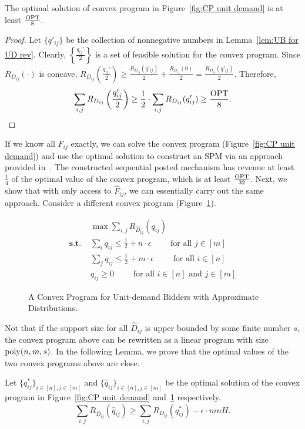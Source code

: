 \begin{lemma}\label{lem:compare exact CP with opt}
	The optimal solution of convex program in Figure~\ref{fig:CP unit demand} is at least $\frac{\text{OPT}}{8}$.
\end{lemma}
\begin{proof}
	Let $\{q'_{ij}\}$ be the collection of nonnegative numbers in Lemma~\ref{lem:UB for UD rev}. Clearly, $\left\{\frac{q_{ij}'}{2}\right\}$ is a set of feasible solution for the convex program. Since $R_{D_{ij}}(\cdot)$ is concave, $R_{D_{ij}}\left(\frac{q_{ij}'}{2}\right)\geq \frac{R_{D_{ij}}(q'_{ij})}{2} + \frac{R_{D_{ij}}(0)}{2}=\frac{R_{D_{ij}}(q'_{ij})}{2}$. Therefore, $$\sum_{i,j} R_{D_{ij}}\left(\frac{q_{ij}'}{2}\right)\geq 
	\frac{1}{2}\cdot \sum_{i,j} R_{D_{ij}}(q'_{ij})\geq \frac{\text{OPT}}{8}.$$
\end{proof}

If we know all $F_{ij}$ exactly, we can solve the convex program (Figure~\ref{fig:CP unit demand}) and use the optimal solution to construct an SPM via an approach provided in~\cite{ChawlaHMS10,CaiDW16}. The constructed sequential posted mechanism has revenue at least $\frac{1}{4}$ of the optimal value of the convex program, which is at least $\frac{\text{OPT}}{32}$. Next, we show that with only access to $\hat{F}_{ij}$, we can essentially carry out the same approach. Consider a different convex program (Figure~\ref{fig:CP unit demand approximate dist}).
\begin{figure}[ht]
\begin{minipage}{\textwidth} 
\begin{align*}
&\max \sum_{i,j} R_{\hat{D}_{ij}}(q_{ij})\\
\textbf{s.t. }& \sum_i q_{ij}\leq \frac{1}{2} + n\cdot\epsilon\qquad \text{ for all $j\in[m]$}\\
& \sum_j q_{ij}\leq \frac{1}{2}+m\cdot\epsilon \qquad \text{ for all $i\in[n]$}\\
& q_{ij}\geq 0\qquad \text{ for all $i\in[n]$ and $j\in[m]$}
\end{align*}
\end{minipage}
\caption{A Convex Program for Unit-demand Bidders with Approximate Distributions.}
\label{fig:CP unit demand approximate dist}
\end{figure}

 Not that if the support size for all $\hat{D}_{ij}$ is upper bounded by some finite number $s$, the convex program above can be rewritten as a linear program with size ${\rm poly}(n,m,s)$.
In the following Lemma, we prove that the optimal values of the two convex programs above are close. %
\begin{lemma}\label{lem:UD compare the two CP}
	Let $\{{q}^*_{ij}\}_{i\in[n],j\in[m]}$ and $\{\hat{q}_{ij}\}_{i\in[n],j\in[m]}$ be the optimal solution of the convex program in Figure~\ref{fig:CP unit demand} and~\ref{fig:CP unit demand approximate dist} respectively.	$$\sum_{i,j}R_{\hat{D}_{ij}}(\hat{q}_{ij})\geq \sum_{i,j}{R}_{D_{ij}}({q}^*_{ij})-\epsilon\cdot mn H.$$
	\end{lemma}


